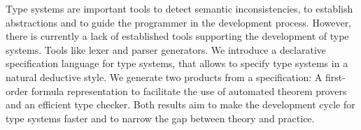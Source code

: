 Type systems are important tools to detect semantic inconsistencies,
to establish abstractions and to guide the programmer in the
development process. However, there is currently a lack of established
tools supporting the development of type systems. Tools like lexer and
parser generators. We introduce a declarative specification language
for type systems, that allows to specify type systems in a natural
deductive style. We generate two products from a specification: A
first-order formula representation to facilitate the use of automated
theorem provers and an efficient type checker. Both results aim to
make the development cycle for type systems faster and to narrow the
gap between theory and practice.

